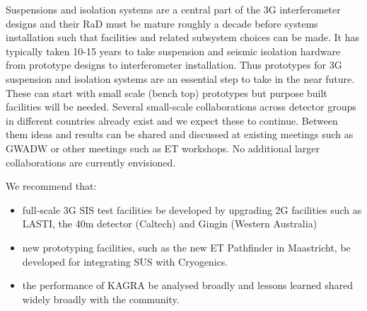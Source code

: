 Suspensions and isolation systems are a central part of the \ac{3G} interferometer designs and their \ac{RaD} must be mature roughly a decade before systems installation such that facilities and related subsystem choices can be made. It has typically taken 10-15 years to take suspension and seismic isolation hardware from prototype designs to interferometer installation. Thus prototypes for \ac{3G} suspension and isolation systems are an essential step to take in the near future. These can start with small scale (bench top) prototypes but purpose built facilities will be needed.  Several small-scale collaborations across detector groups in different countries already exist and we expect these to continue. Between them ideas and results can be shared and discussed at existing meetings such as \ac{GWADW} or other meetings such as \ac{ET} workshops. No additional larger collaborations are currently envisioned. 

We recommend that:
\begin{itemize}
\item full-scale \ac{3G} \acs{SIS}  test facilities be developed by upgrading \ac{2G} facilities such as \ac{LASTI}, the 40m detector (Caltech) and Gingin (Western Australia) 
\item new prototyping facilities, such as the new \ac{ET} Pathfinder in Maastricht,  be developed  for integrating \ac{SUS} with Cryogenics.
\item the performance  of \ac{KAGRA} be analysed broadly and lessons learned shared widely broadly with the community.
\end{itemize}






